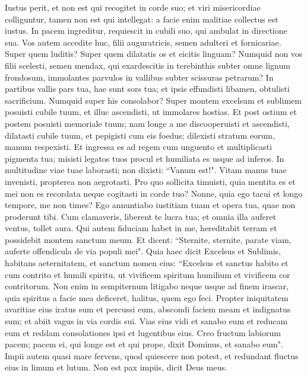 \begin{biblechapter}  
\verse Iustus perit, et non est qui recogitet in corde suo; et viri misericordiae colliguntur, tamen non est qui intellegat: a facie enim malitiae collectus est iustus. 
\verse In pacem ingreditur, requiescit in cubili suo, qui ambulat in directione sua. 
\verse Vos autem accedite huc, filii auguratricis, semen adulteri et fornicariae. 
\verse Super quem luditis? Super quem dilatatis os et eicitis linguam? Numquid non vos filii scelesti, semen mendax, 
\verse qui exardescitis in terebinthis subter omne lignum frondosum, immolantes parvulos in vallibus subter scissuras petrarum? 
\verse In partibus vallis pars tua, hae sunt sors tua; et ipsis effundisti libamen, obtulisti sacrificium. Numquid super his consolabor? 
\verse Super montem excelsum et sublimem posuisti cubile tuum, et illuc ascendisti, ut immolares hostias. 
\verse Et post ostium et postem posuisti memoriale tuum; nam longe a me discooperuisti et ascendisti, dilatasti cubile tuum, et pepigisti cum eis foedus; dilexisti stratum eorum, manum respexisti. 
\verse Et ingressa es ad regem cum unguento et multiplicasti pigmenta tua; misisti legatos tuos procul et humiliata es usque ad inferos. 
\verse In multitudine viae tuae laborasti; non dixisti: “Vanum est!". Vitam manus tuae invenisti, propterea non aegrotasti. 
\verse Pro quo sollicita timuisti, quia mentita es et mei non es recordata neque cogitasti in corde tuo? Nonne, quia ego tacui et longo tempore, me non times? 
\verse Ego annuntiabo iustitiam tuam et opera tua, quae non proderunt tibi. 
\verse Cum clamaveris, liberent te lucra tua; et omnia illa auferet ventus, tollet aura. Qui autem fiduciam habet in me, hereditabit terram et possidebit montem sanctum meum. 
\verse Et dicent: “Sternite, sternite, parate viam, auferte offendicula de via populi mei". 
\verse Quia haec dicit Excelsus et Sublimis, habitans aeternitatem, et sanctum nomen eius: “Excelsus et sanctus habito et cum contrito et humili spiritu, ut vivificem spiritum humilium et vivificem cor contritorum. 
\verse Non enim in sempiternum litigabo neque usque ad finem irascar, quia spiritus a facie mea deficeret, halitus, quem ego feci. 
\verse Propter iniquitatem avaritiae eius iratus sum et percussi eum, abscondi faciem meam et indignatus sum; et abiit vagus in via cordis sui. 
\verse Vias eius vidi et sanabo eum et reducam eum et reddam consolationes ipsi et lugentibus eius. 
\verse Creo fructum labiorum pacem; pacem ei, qui longe est et qui prope, dixit Dominus, et sanabo eum". 
\verse Impii autem quasi mare fervens, quod quiescere non potest, et redundant fluctus eius in limum et lutum. 
\verse Non est pax impiis, dicit Deus meus. 
\end{biblechapter}


